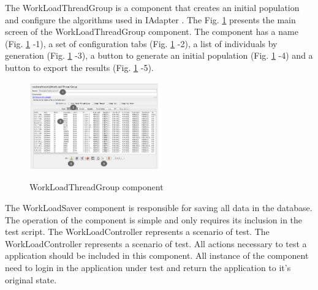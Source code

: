 The WorkLoadThreadGroup is a component that creates an initial population and configure the algorithms used in IAdapter . The Fig. \ref{fig:tela1iadapter} presents the main screen of the WorkLoadThreadGroup component. The component has a name (Fig. \ref{fig:tela1iadapter} -1), a set of configuration tabs (Fig. \ref{fig:tela1iadapter} -2), a list of individuals by generation (Fig. \ref{fig:tela1iadapter} -3), a button to generate an initial population (Fig. \ref{fig:tela1iadapter} -4) and a button to export the results (Fig. \ref{fig:tela1iadapter} -5).

\begin{figure}[h]
\caption{WorkLoadThreadGroup component}
\includegraphics[width=0.5\textwidth]{./images/tela1iadapter.png}
\label{fig:tela1iadapter}
\end{figure}

The WorkLoadSaver component is responsible for saving all data in the database. The operation of the component is simple and only requires its inclusion in the test script. The WorkLoadController represents a scenario of test. The WorkLoadController represents a scenario of test. All actions necessary to test a application should be included in this component. All instance of the component need to login in the application under test and return the application to it's original state.